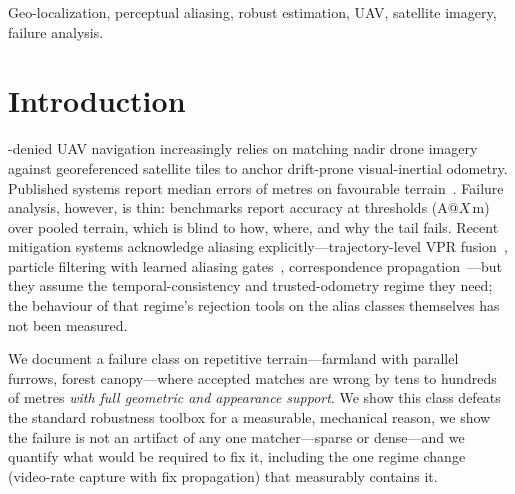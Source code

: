 \documentclass[journal]{IEEEtran}
\begin{document}
\begin{abstract}
georeferencing bias), and a pre-registered replication protocol complete the contribution.
\end{abstract}

\begin{IEEEkeywords}
Geo-localization, perceptual aliasing, robust estimation, UAV, satellite imagery, failure analysis.
\end{IEEEkeywords}

\IEEEpeerreviewmaketitle

\section{Introduction}
-denied UAV navigation increasingly relies on matching nadir drone imagery against georeferenced satellite tiles to anchor drift-prone visual-inertial odometry. Published systems report median errors of metres on favourable terrain~\cite{anyvisloc,orthotrack,ortholoc}. Failure analysis, however, is thin: benchmarks report accuracy at thresholds (A@$X$\,m) over pooled terrain, which is blind to how, where, and why the tail fails. Recent mitigation systems acknowledge aliasing explicitly---trajectory-level VPR fusion~\cite{naviloc}, particle filtering with learned aliasing gates~\cite{cpfl}, correspondence propagation~\cite{orthotrack}---but they assume the temporal-consistency and trusted-odometry regime they need; the behaviour of that regime's rejection tools on the alias classes themselves has not been measured.

We document a failure class on repetitive terrain---farmland with parallel furrows, forest canopy---where accepted matches are wrong by tens to hundreds of metres \emph{with full geometric and appearance support}. We show this class defeats the standard robustness toolbox for a measurable, mechanical reason, we show the failure is not an artifact of any one matcher---sparse or dense---and we quantify what would be required to fix it, including the one regime change (video-rate capture with fix propagation) that measurably contains it.
\end{document}
